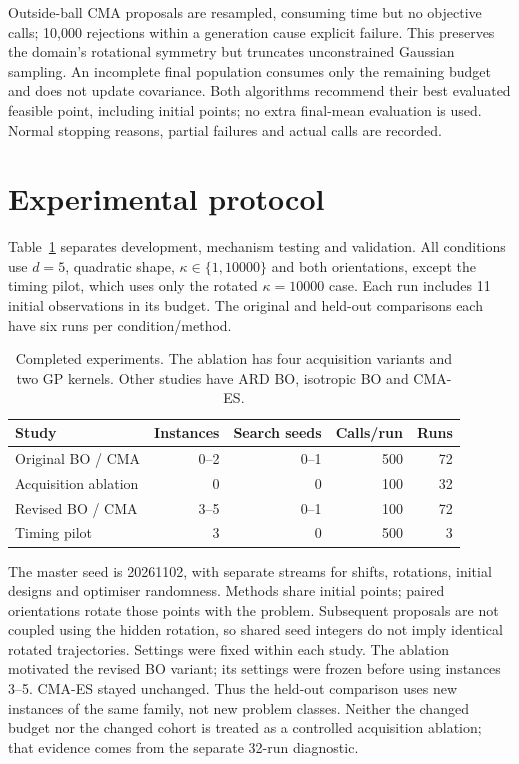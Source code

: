 \documentclass[12pt]{article}
\begin{document}
Outside-ball CMA proposals are resampled, consuming time but no objective
calls; 10,000 rejections within a generation cause explicit failure. This
preserves the domain's rotational symmetry but truncates unconstrained Gaussian
sampling. An incomplete final population consumes only the remaining budget
and does not update covariance. Both algorithms recommend their best evaluated
feasible point, including initial points; no extra final-mean evaluation is used.
Normal stopping reasons, partial failures and actual calls are recorded.

\section{Experimental protocol}
Table~\ref{tab:studies} separates development, mechanism testing and validation.
All conditions use $d=5$, quadratic shape, $\kappa\in\{1, 10000\}$ and both
orientations, except the timing pilot, which uses only the rotated
$\kappa=10000$ case. Each run includes 11 initial observations in its budget.
The original and held-out comparisons each have six runs per condition/method.
\begin{table}[htbp]
\centering\small
\begin{tabular}{lrrrr}
\hline
Study & Instances & Search seeds & Calls/run & Runs \\
\hline
Original BO / CMA & 0--2 & 0--1 & 500 & 72 \\
Acquisition ablation & 0 & 0 & 100 & 32 \\
Revised BO / CMA & 3--5 & 0--1 & 100 & 72 \\
Timing pilot & 3 & 0 & 500 & 3 \\
\hline
\end{tabular}
\caption{Completed experiments. The ablation has four acquisition variants and
 two GP kernels. Other studies have ARD BO, isotropic BO and CMA-ES.}
\label{tab:studies}
\end{table}

The master seed is 20261102, with separate streams for shifts, rotations,
initial designs and optimiser randomness. Methods share initial points;
paired orientations rotate those points with the problem. Subsequent proposals
are not coupled using the hidden rotation, so shared seed integers do not
imply identical rotated trajectories. Settings were fixed within each study.
The ablation motivated the revised BO variant; its settings were frozen before
using instances 3--5. CMA-ES stayed unchanged. Thus the held-out comparison
uses new instances of the same family, not new problem classes. Neither the
changed budget nor the changed cohort is treated as a controlled acquisition
ablation; that evidence comes from the separate 32-run diagnostic.
\end{document}
